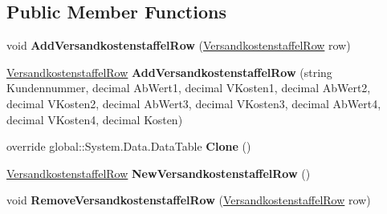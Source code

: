 \subsection*{Public Member Functions}
\begin{DoxyCompactItemize}
\item 
void {\bfseries Add\+Versandkostenstaffel\+Row} (\hyperlink{class_products_1_1_data_1_1ds_sage_1_1_versandkostenstaffel_row}{Versandkostenstaffel\+Row} row)\hypertarget{class_products_1_1_data_1_1ds_sage_1_1_versandkostenstaffel_data_table_adda9613bffd2949f4f383ac2d9ecd46a}{}\label{class_products_1_1_data_1_1ds_sage_1_1_versandkostenstaffel_data_table_adda9613bffd2949f4f383ac2d9ecd46a}

\item 
\hyperlink{class_products_1_1_data_1_1ds_sage_1_1_versandkostenstaffel_row}{Versandkostenstaffel\+Row} {\bfseries Add\+Versandkostenstaffel\+Row} (string Kundennummer, decimal Ab\+Wert1, decimal V\+Kosten1, decimal Ab\+Wert2, decimal V\+Kosten2, decimal Ab\+Wert3, decimal V\+Kosten3, decimal Ab\+Wert4, decimal V\+Kosten4, decimal Kosten)\hypertarget{class_products_1_1_data_1_1ds_sage_1_1_versandkostenstaffel_data_table_a53b4504a3dbb9bf7418ed4ce6e2852c4}{}\label{class_products_1_1_data_1_1ds_sage_1_1_versandkostenstaffel_data_table_a53b4504a3dbb9bf7418ed4ce6e2852c4}

\item 
override global\+::\+System.\+Data.\+Data\+Table {\bfseries Clone} ()\hypertarget{class_products_1_1_data_1_1ds_sage_1_1_versandkostenstaffel_data_table_a60a8a4a09d8ef240e89a95c92100a602}{}\label{class_products_1_1_data_1_1ds_sage_1_1_versandkostenstaffel_data_table_a60a8a4a09d8ef240e89a95c92100a602}

\item 
\hyperlink{class_products_1_1_data_1_1ds_sage_1_1_versandkostenstaffel_row}{Versandkostenstaffel\+Row} {\bfseries New\+Versandkostenstaffel\+Row} ()\hypertarget{class_products_1_1_data_1_1ds_sage_1_1_versandkostenstaffel_data_table_ab16f39610aae132f357c27d307383283}{}\label{class_products_1_1_data_1_1ds_sage_1_1_versandkostenstaffel_data_table_ab16f39610aae132f357c27d307383283}

\item 
void {\bfseries Remove\+Versandkostenstaffel\+Row} (\hyperlink{class_products_1_1_data_1_1ds_sage_1_1_versandkostenstaffel_row}{Versandkostenstaffel\+Row} row)\hypertarget{class_products_1_1_data_1_1ds_sage_1_1_versandkostenstaffel_data_table_af489a7dec7acc266277a72da895656e5}{}\label{class_products_1_1_data_1_1ds_sage_1_1_versandkostenstaffel_data_table_af489a7dec7acc266277a72da895656e5}

\end{DoxyCompactItemize}

